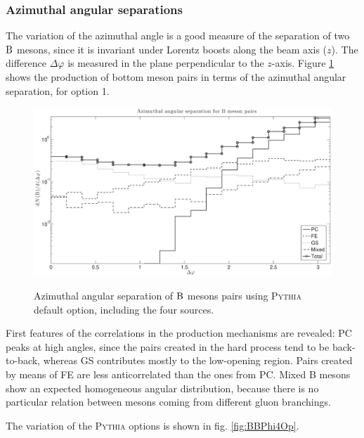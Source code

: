 \documentclass[a4paper,12pt]{article}
\begin{document}
\subsubsection{Azimuthal angular separations}

The variation of the azimuthal angle is a good measure of the separation of two $\B$ mesons, since it is invariant under Lorentz boosts along the beam axis ($z$). The difference $\Delta \varphi$ is measured in the plane perpendicular to the $z$-axis. Figure \ref{fig:BBPhiOp1} shows the production of bottom meson pairs in terms of the azimuthal angular separation, for option 1.

\begin{figure}[!h]
\centering
\caption[$\B$ meson pairs azimuthal angular separation. \textsc{Pythia} default option.]{Azimuthal angular separation of $\B$ mesons pairs using \textsc{Pythia} default option, including the four sources.}
\includegraphics[width=15cm]{BBPhiOp1.eps}
\label{fig:BBPhiOp1}
\end{figure}
First features of the correlations in the production mechanisms are revealed: PC peaks at high angles, since the pairs created in the hard process tend to be back-to-back, whereas GS contributes mostly to the low-opening region. Pairs created by means of FE are less anticorrelated than the ones from PC. Mixed B mesons show an expected homogeneous angular distribution, because there is no particular relation between mesons coming from different gluon branchings.

The variation of the \textsc{Pythia} options is shown in fig. \ref{fig:BBPhi4Op}.
\end{document}
